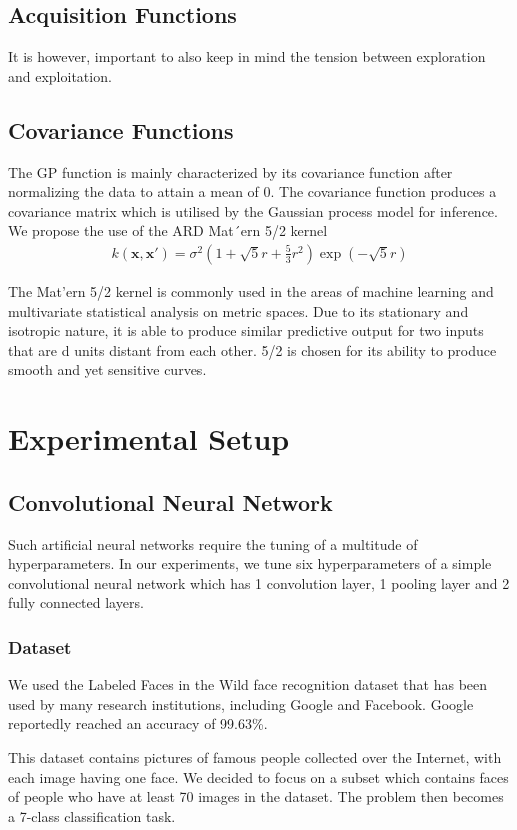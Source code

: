 \documentclass[letterpaper]{article}
\begin{document}
\subsection{Acquisition Functions}
It is however, important to also keep in mind the tension between exploration and
exploitation.

\subsection{Covariance Functions}
The GP function is mainly characterized by its covariance function after normalizing the data to attain a mean of 0. The covariance function produces a covariance matrix which is utilised by the Gaussian process model for inference.
We propose the use of the ARD Mat´ern 5/2 kernel
\begin{align*}
	k (\textbf{x},\textbf{x}') = \sigma^2(1+\sqrt5r+\frac{5}{3}r^2)\exp(-\sqrt5r)
\end{align*}

The Mat'ern 5/2 kernel is commonly used in the areas of machine learning and multivariate statistical analysis on metric spaces. Due to its stationary and isotropic nature, it is able to produce similar predictive output for two inputs that are d units distant from each other. 5/2 is chosen for its ability to produce smooth and yet sensitive curves.

\section{Experimental Setup}

\subsection{Convolutional Neural Network}
Such artificial neural networks require the tuning of a multitude of hyperparameters. In our experiments, we tune six hyperparameters of a simple convolutional neural network which has 1 convolution layer, 1 pooling layer and 2 fully connected layers.

\subsubsection{Dataset}
We used the Labeled Faces in the Wild face recognition dataset that has been used by many research institutions, including Google and Facebook. Google reportedly reached an accuracy of 99.63\%.

This dataset contains pictures of famous people collected over the Internet, with each image having one face. We decided to focus on a subset which contains faces of people who have at least 70 images in the dataset. The problem then becomes a 7-class classification task.
\end{document}
